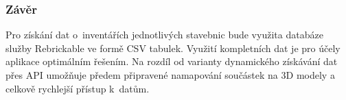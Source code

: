   \subsubsection{Závěr}
  Pro získání dat o~inventářích jednotlivých stavebnic bude využita databáze služby Rebrickable ve formě \gls{CSV} tabulek. Využití kompletních dat je pro účely aplikace optimálním řešením. Na rozdíl od varianty dynamického získávání dat přes \gls{API} umožňuje předem připravené namapování součástek na 3D modely a celkově rychlejší přístup k~datům.
